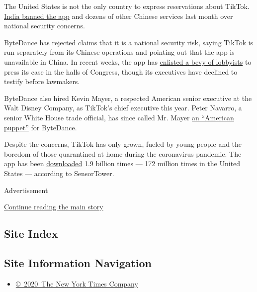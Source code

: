 The United States is not the only country to express reservations about
TikTok.
\href{https://www.nytimes.com/2020/06/29/world/asia/tik-tok-banned-india-china.html}{India
banned the app} and dozens of other Chinese services last month over
national security concerns.

ByteDance has rejected claims that it is a national security risk,
saying TikTok is run separately from its Chinese operations and pointing
out that the app is unavailable in China. In recent weeks, the app has
\href{https://www.nytimes.com/2020/07/15/technology/tiktok-washington-lobbyist.html}{enlisted
a bevy of lobbyists} to press its case in the halls of Congress, though
its executives have declined to testify before lawmakers.

ByteDance also hired Kevin Mayer, a respected American senior executive
at the Walt Disney Company, as TikTok's chief executive this year. Peter
Navarro, a senior White House trade official, has since called Mr. Mayer
\href{https://www.cnbc.com/2020/07/13/trump-advisor-navarro-calls-tiktok-ceo-kevin-mayer-an-american-puppet.html}{an
``American puppet''} for ByteDance.

Despite the concerns, TikTok has only grown, fueled by young people and
the boredom of those quarantined at home during the coronavirus
pandemic. The app has been
\href{https://www.nytimes.com/2020/05/18/business/media/tiktok-ceo-kevin-mayer.html}{downloaded}
1.9 billion times --- 172 million times in the United States ---
according to SensorTower.

Advertisement

\protect\hyperlink{after-bottom}{Continue reading the main story}

\hypertarget{site-index}{%
\subsection{Site Index}\label{site-index}}

\hypertarget{site-information-navigation}{%
\subsection{Site Information
Navigation}\label{site-information-navigation}}

\begin{itemize}
\tightlist
\item
  \href{https://help.nytimes.com/hc/en-us/articles/115014792127-Copyright-notice}{©~2020~The
  New York Times Company}
\end{itemize}

